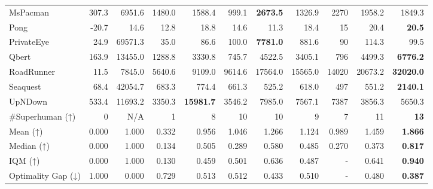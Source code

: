 \begin{table*}[ht!]
{\begin{tabular}{lrrrrrrrrrr}
MsPacman            &  307.3     &  6951.6    &  1480.0    &  1588.4             &  999.1             &  \textbf{2673.5}    &  1326.9      &  2270     &  1958.2            &  1849.3              \\
Pong                &  -20.7     &  14.6      &  12.8      &  18.8               &  14.6              &  11.3               &  18.4        &  15       &  20.4              &  \textbf{20.5}       \\
PrivateEye          &  24.9      &  69571.3   &  35.0      &  86.6               &  100.0             &  \textbf{7781.0}    &  881.6       &  90       &  114.3             &  99.5                \\
Qbert               &  163.9     &  13455.0   &  1288.8    &  3330.8             &  745.7             &  4522.5             &  3405.1      &  796      &  4499.3            &  \textbf{6776.2}     \\
RoadRunner          &  11.5      &  7845.0    &  5640.6    &  9109.0             &  9614.6            &  17564.0            &  15565.0     &  14020    &  20673.2           &  \textbf{32020.0}    \\
Seaquest            &  68.4      &  42054.7   &  683.3     &  774.4              &  661.3             &  525.2              &  618.0       &  497      &  551.2             &  \textbf{2140.1}     \\
UpNDown             &  533.4     &  11693.2   &  3350.3    &  \textbf{15981.7}   &  3546.2            &  7985.0             &  7567.1      &  7387     &  3856.3            &  5650.3              \\
\midrule
\#Superhuman (↑)    &  0         &  N/A       &  1         &  8                  &  10                &  10                 &  9           &  7         &  11                &  \textbf{13}         \\
Mean (↑)            &  0.000     &  1.000     &  0.332     &  0.956              &  1.046             &  1.266              &  1.124       &  0.989     &  1.459             &  \textbf{1.866}      \\
Median (↑)          &  0.000     &  1.000     &  0.134     &  0.505              &  0.289             &  0.580              &  0.485       &  0.270     &  0.373             &  \textbf{0.817}      \\
IQM (↑)             &  0.000     &  1.000     &  0.130     &  0.459              &  0.501             &  0.636              &  0.487       &  -         &  0.641             &  \textbf{0.940}      \\
Optimality Gap (↓)  &  1.000     &  0.000     &  0.729     &  0.513              &  0.512             &  0.433              &  0.510       &  -         &  0.480             &  \textbf{0.387}      \\

  \end{tabular}}
  \vspace{-1.5em}
\end{table*}